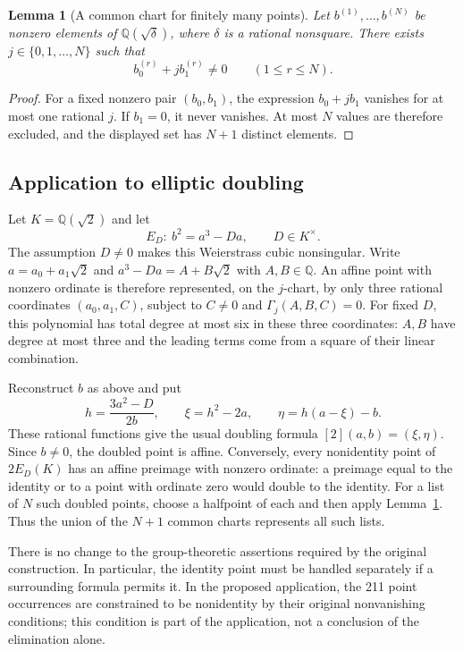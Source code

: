 \documentclass[11pt]{article}
\newtheorem{lemma}[theorem]{Lemma}
\theoremstyle{definition}
\begin{document}
\begin{lemma}[A common chart for finitely many points]
\label{lem:common-quadratic-chart}
Let $b^{(1)},\ldots,b^{(N)}$ be nonzero elements of
$\mathbb Q(\sqrt\delta)$, where $\delta$ is a rational nonsquare.
There exists $j\in\{0,1,\ldots,N\}$ such that
\[
 b^{(r)}_0+j b^{(r)}_1\ne0\qquad(1\leq r\leq N).
\]
\end{lemma}
\begin{proof}
For a fixed nonzero pair $(b_0,b_1)$, the expression $b_0+jb_1$
vanishes for at most one rational $j$.  If $b_1=0$, it never
vanishes.  At most $N$ values are therefore excluded, and the
displayed set has $N+1$ distinct elements.
\end{proof}

\subsection{Application to elliptic doubling}

Let $K=\mathbb Q(\sqrt2)$ and let
\[
 E_D:\ b^2=a^3-Da,\qquad D\in K^\times.
\]
The assumption $D\ne0$ makes this Weierstrass cubic nonsingular.
Write $a=a_0+a_1\sqrt2$ and
$a^3-Da=A+B\sqrt2$ with $A,B\in\mathbb Q$.
An affine point with nonzero ordinate is therefore represented,
on the $j$-chart, by only three rational coordinates
$(a_0,a_1,C)$, subject to $C\ne0$ and $\Gamma_j(A,B,C)=0$.
For fixed $D$, this polynomial has total degree at most six in these
three coordinates: $A,B$ have degree at most three and the leading
terms come from a square of their linear combination.

Reconstruct $b$ as above and put
\[
 h=\frac{3a^2-D}{2b},\qquad
 \xi=h^2-2a,\qquad \eta=h(a-\xi)-b.
\]
These rational functions give the usual doubling formula
$[2](a,b)=(\xi,\eta)$.  Since $b\ne0$, the doubled point is affine.
Conversely, every nonidentity point of $2E_D(K)$ has an affine
preimage with nonzero ordinate: a preimage equal to the identity or
to a point with ordinate zero would double to the identity.
For a list of $N$ such doubled points, choose a halfpoint of each
and then apply Lemma~\ref{lem:common-quadratic-chart}.  Thus the
union of the $N+1$ common charts represents all such lists.

There is no change to the group-theoretic assertions required by the
original construction.  In particular, the identity point must be
handled separately if a surrounding formula permits it.  In the
proposed application, the 211 point occurrences are constrained to be
nonidentity by their original nonvanishing conditions; this condition
is part of the application, not a conclusion of the elimination alone.
\end{document}
